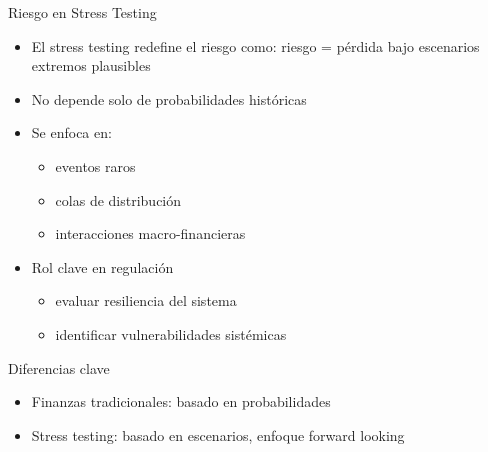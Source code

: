 \documentclass{beamer}
\begin{document}
\begin{frame}{Riesgo en Stress Testing}
\begin{itemize}
    \item El stress testing redefine el riesgo como:
    riesgo = pérdida bajo escenarios extremos plausibles
    \vspace{0.3cm}
    \item No depende solo de probabilidades históricas
    \vspace{0.3cm}
    
    \item Se enfoca en:
    \begin{itemize}
        \item eventos raros
        \item colas de distribución
        \item interacciones macro-financieras
    \end{itemize}
    \item Rol clave en regulación
    \begin{itemize}
        \item evaluar resiliencia del sistema
        \item identificar vulnerabilidades sistémicas
    \end{itemize}
\end{itemize}
    
\end{frame}
\begin{frame}{Diferencias clave}
\begin{itemize}
    \item Finanzas tradicionales: basado en probabilidades
    \item Stress testing: basado en escenarios, enfoque forward looking
\end{itemize}
    
\end{frame}
\end{document}
